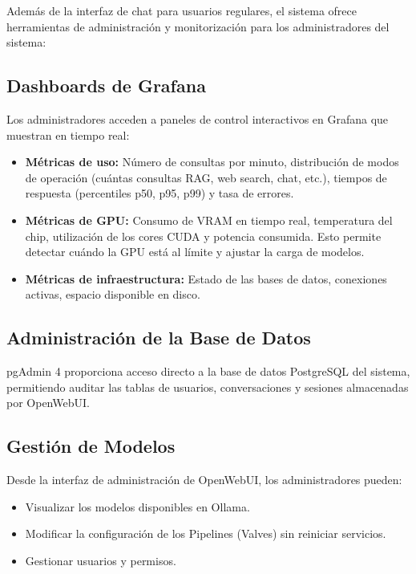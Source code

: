 Además de la interfaz de chat para usuarios regulares, el sistema ofrece herramientas de administración y monitorización para los administradores del sistema:

\subsection{Dashboards de Grafana}

Los administradores acceden a paneles de control interactivos en Grafana que muestran en tiempo real:

\begin{itemize}
    \item \textbf{Métricas de uso:} Número de consultas por minuto, distribución de modos de operación (cuántas consultas RAG, web search, chat, etc.), tiempos de respuesta (percentiles p50, p95, p99) y tasa de errores.
    \item \textbf{Métricas de GPU:} Consumo de VRAM en tiempo real, temperatura del chip, utilización de los cores CUDA y potencia consumida. Esto permite detectar cuándo la GPU está al límite y ajustar la carga de modelos.
    \item \textbf{Métricas de infraestructura:} Estado de las bases de datos, conexiones activas, espacio disponible en disco.
\end{itemize}

\subsection{Administración de la Base de Datos}

pgAdmin 4 proporciona acceso directo a la base de datos PostgreSQL del sistema, permitiendo auditar las tablas de usuarios, conversaciones y sesiones almacenadas por OpenWebUI.

\subsection{Gestión de Modelos}

Desde la interfaz de administración de OpenWebUI, los administradores pueden:
\begin{itemize}
    \item Visualizar los modelos disponibles en Ollama.
    \item Modificar la configuración de los Pipelines (Valves) sin reiniciar servicios.
    \item Gestionar usuarios y permisos.
\end{itemize}
